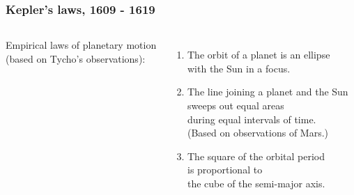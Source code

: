 \documentclass[aspectratio=169,xcolor=pdftex,dvipsnames]{beamer} %
\begin{document}
\begin{frame}
\frametitle{Kepler's laws, 1609 - 1619}

\begin{columns}



Empirical laws of planetary motion\\
(based on Tycho's observations):
\\ \ \\
\begin{enumerate}
\item 
The orbit of a planet is an ellipse\\ with the Sun in a focus.
\item
The line joining a planet and the Sun\\
 sweeps out equal areas\\ during equal intervals of time.\\
(Based on observations of Mars.)
\item 
The square of the orbital period\\ is proportional to\\ the cube of the semi-major axis.
\end{enumerate}

\end{columns} 

\end{frame}
\end{document}
